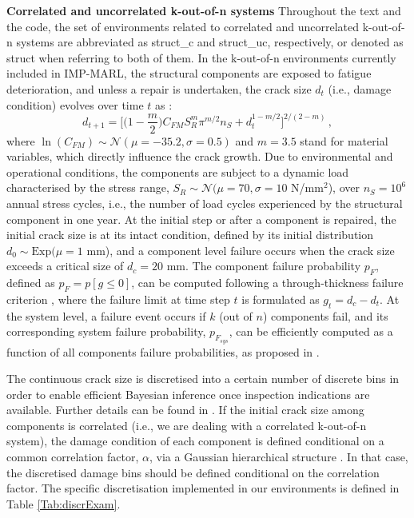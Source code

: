 \textbf{Correlated and uncorrelated k-out-of-n systems}
Throughout the text and the code, the set of environments related to correlated and uncorrelated k-out-of-n systems are abbreviated as struct\_c and struct\_uc, respectively, or denoted as struct when referring to both of them. 
In the k-out-of-n environments currently included in IMP-MARL, the structural components are exposed to fatigue deterioration, and unless a repair is undertaken, the crack size $d_t$  (i.e., damage condition) evolves over time $t$ as \citep{Ditlevsen2007StructuralMethods}: 
\begin{equation} \label{Eq:ExamCrackGrow}
d_{t+1} =\bigg[ \Big(1-\frac{m}{2}\Big) C_{FM}S_{R}^m\pi ^{m/2}n_{S} + d_t^{1-m/2}\bigg] ^{2/(2-m)} \, ,
\end{equation}
where $\ln(C_{FM}) \sim \mathcal{N} (\mu=-35.2, \sigma=0.5)$ and $m=3.5$ stand for material variables, which directly influence the crack growth.
Due to environmental and operational conditions, the components are subject to a dynamic load characterised by the stress range, $S_{R}  \sim  \mathcal{N} (\mu=70, \sigma=10$ N/mm$^2$), over $n_{S}=10^6$ annual stress cycles, i.e., the number of load cycles experienced by the structural component in one year.
At the initial step or after a component is repaired, the initial crack size is at its intact condition, defined by its initial distribution $d_0  \sim  \text{Exp} (\mu=1$ mm), and a component level failure occurs when the crack size exceeds a critical size of $d_c=20$ mm. 
The component failure probability $p_{F}$, defined as $p_{F}=p[g \leq 0]$, can be computed following a through-thickness failure criterion \cite{hlaing2022inspection}, where the failure limit at time step $t$ is formulated as $g_{t}=d_c-d_t$. At the system level, a failure event occurs if $k$ (out of $n$) components fail, and its corresponding system failure probability, $p_{F_{sys}}$, can be efficiently computed as a function of all components failure probabilities, as proposed in \citep{barlow1984computing}. 

The continuous crack size is discretised into a certain number of discrete bins in order to enable efficient Bayesian inference once inspection indications are available.
Further details can be found in \citep{morato2022optimal}. 
If the initial crack size among components is correlated (i.e., we are dealing with a correlated k-out-of-n system), the damage condition of each component is defined conditional on a common correlation factor, $\alpha$, via a Gaussian hierarchical structure \citep{morato2022syst}.
In that case, the discretised damage bins should be defined conditional on the correlation factor.
The specific discretisation implemented in our environments is defined in Table \ref{Tab:discrExam}. 

